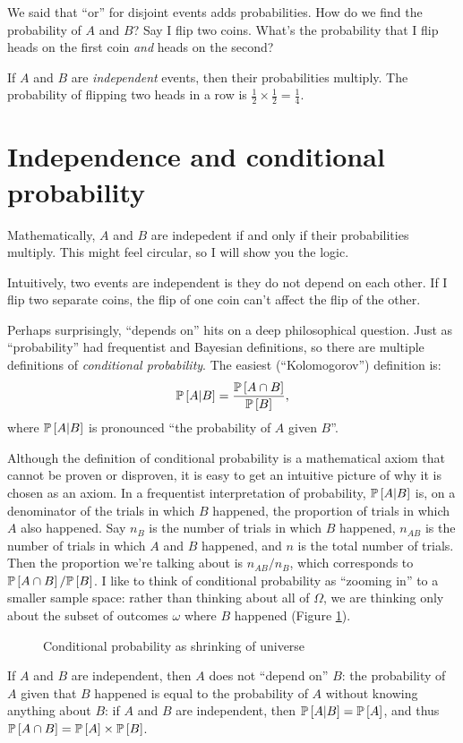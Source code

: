 We said that ``or'' for disjoint events adds probabilities. How do we
find the probability of $A$ and $B$? Say I flip two coins. What's the
probability that I flip heads on the first coin \emph{and} heads on the second?

If $A$ and $B$ are \emph{independent} events, then their probabilities
multiply. The probability of flipping two heads in a row is $\tfrac{1}{2} \times
\tfrac{1}{2} = \tfrac{1}{4}$.

\section{Independence and conditional probability}

Mathematically, $A$ and $B$ are indepedent if and only if their probabilities
multiply. This might feel circular, so I will show you the logic.

Intuitively, two events are independent is they do not depend on each other. If
I flip two separate coins, the flip of one coin can't affect the flip of the
other.

Perhaps surprisingly, ``depends on'' hits on a deep philosophical question.
Just as ``probability'' had frequentist and Bayesian definitions, so there are
multiple definitions of \emph{conditional probability}. The easiest
(``Kolomogorov'') definition is:
\begin{equation*}
\mathbb{P}\left[{A | B}\right] = \frac{\mathbb{P}\left[{A \cap B}\right]}{\mathbb{P}\left[{B}\right]},
\end{equation*}
where $\mathbb{P}\left[{A | B}\right]$ is pronounced ``the probability of $A$ given $B$''.

Although the definition of conditional probability is a mathematical axiom that
cannot be proven or disproven, it is easy to get an intuitive picture of why it
is chosen as an axiom. In a frequentist interpretation of probability, $\mathbb{P}\left[{A
| B}\right]$ is, on a denominator of the trials in which $B$ happened, the proportion
of trials in which $A$ also happened. Say $n_B$ is the number of trials in
which $B$ happened, $n_{AB}$ is the number of trials in which $A$ and $B$
happened, and $n$ is the total number of trials. Then the proportion we're
talking about is $n_{AB} / n_B$, which corresponds to $\mathbb{P}\left[{A \cap B}\right] /
\mathbb{P}\left[{B}\right]$. I like to think of conditional probability as ``zooming in'' to a
smaller sample space: rather than thinking about all of $\Omega$, we are
thinking only about the subset of outcomes $\omega$ where $B$ happened (Figure
\ref{fig:conditional-probability}).

\begin{figure}
\caption{Conditional probability as shrinking of universe}
\label{fig:conditional-probability}
\end{figure}

If $A$ and $B$ are independent, then $A$ does not ``depend on'' $B$: the
probability of $A$ given that $B$ happened is equal to the probability of $A$
without knowing anything about $B$: if $A$ and $B$ are independent, then
$\mathbb{P}\left[{A | B}\right] = \mathbb{P}\left[{A}\right]$, and thus $\mathbb{P}\left[{A \cap B}\right] = \mathbb{P}\left[{A}\right] \times
\mathbb{P}\left[{B}\right]$.
